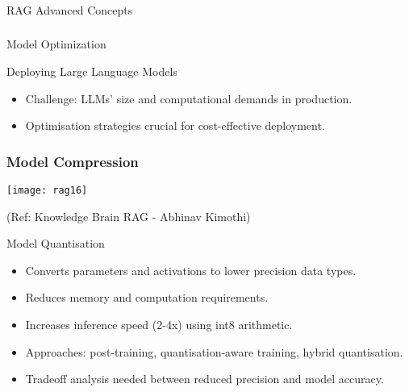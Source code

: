 \begin{frame}[fragile]\frametitle{}
\begin{center}
{\Large RAG Advanced Concepts}
\end{center}
\end{frame}

\begin{frame}[fragile]\frametitle{}
\begin{center}
{\Large Model Optimization}
\end{center}
\end{frame}


\begin{frame}[fragile]{Deploying Large Language Models}
  \begin{itemize}
    \item Challenge: LLMs' size and computational demands in production.
    \item Optimisation strategies crucial for cost-effective deployment.
  \end{itemize}
\end{frame}

\begin{frame}[fragile]\frametitle{Model Compression}


		\begin{center}
		\texttt{[image: rag16]}
		\end{center}

{\tiny (Ref: Knowledge Brain RAG - Abhinav  Kimothi)}

\end{frame}


\begin{frame}[fragile]{Model Quantisation}
  \begin{itemize}
    \item Converts parameters and activations to lower precision data types.
    \item Reduces memory and computation requirements.
    \item Increases inference speed (2-4x) using int8 arithmetic.
    \item Approaches: post-training, quantisation-aware training, hybrid quantisation.
    \item Tradeoff analysis needed between reduced precision and model accuracy.
  \end{itemize}
\end{frame}

